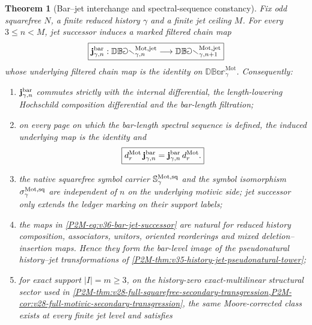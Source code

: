 \documentclass[11pt]{article}
\newtheorem{theorem}{Theorem}[section]
\theoremstyle{remark}
\newcommand{\Mot}{\mathrm{Mot}}
\begin{document}
\begin{theorem}[Bar--jet interchange and spectral-sequence constancy]
\label{P2M-thm:v36-bar-jet-interchange}
Fix odd squarefree $N$, a finite reduced history $\gamma$ and a finite jet
ceiling $M$.  For every $3\le n<M$, jet successor induces a marked filtered
chain map
\begin{equation}
 \boxed{
 \mathbf j^{\rm bar}_{\gamma,n}:
 \mathbb{DBar}_{\gamma,n}^{\Mot,\mathrm{jet}}
 \longrightarrow
 \mathbb{DBar}_{\gamma,n+1}^{\Mot,\mathrm{jet}}}
 \label{P2M-eq:v36-bar-jet-successor}
\end{equation}
whose underlying filtered chain map is the identity on
$\mathbb{DBar}_{\gamma}^{\Mot}$.  Consequently:
\begin{enumerate}[label=\textup{(\roman*)}]
\item $\mathbf j^{\rm bar}_{\gamma,n}$ commutes strictly with the internal
      differential, the length-lowering Hochschild composition differential
      and the bar-length filtration;
\item on every page on which the bar-length spectral sequence is defined, the
      induced underlying map is the identity and
      \begin{equation}
       \boxed{
       d_r^{\Mot}\,\mathbf j^{\rm bar}_{\gamma,n}
       =
       \mathbf j^{\rm bar}_{\gamma,n}\,d_r^{\Mot}.}
       \label{P2M-eq:v36-jet-bar-page-interchange}
      \end{equation}
\item the native squarefree symbol carrier
      $\mathbb S_\gamma^{\Mot,\rm sq}$ and the symbol isomorphism
      $\sigma_\gamma^{\Mot,\rm sq}$ are independent of $n$ on the underlying
      motivic side; jet successor only extends the ledger marking on their
      support labels;
\item the maps in \eqref{P2M-eq:v36-bar-jet-successor} are natural for reduced
      history composition, associators, unitors, oriented reorderings and
      mixed deletion--insertion maps.  Hence they form the bar-level image of
      the pseudonatural history--jet transformations of
      \cref{P2M-thm:v35-history-jet-pseudonatural-tower};
\item for exact support $|I|=m\ge3$, on the history-zero exact-multilinear
      structural sector used in
      \cref{P2M-thm:v28-full-squarefree-secondary-transgression,P2M-cor:v28-full-motivic-secondary-transgression},
      the same Moore-corrected class exists at every finite jet level and
      satisfies
      \begin{equation}

\end{equation}
\end{enumerate}
\end{theorem}
\end{document}
